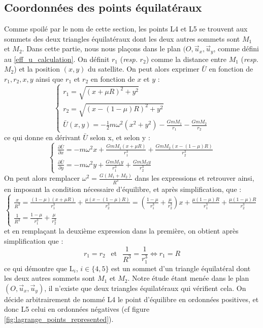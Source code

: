 \documentclass[12pt]{article}
\begin{document}
	\subsection{Coordonnées des points équilatéraux}
	Comme spoilé par le nom de cette section, les points L4 et L5 se trouvent aux sommets des deux triangles équilatéraux dont les deux autres sommets sont $M_1$ et $M_2$. Dans cette partie, nous nous plaçons dans le plan $(O,\vec{u}_x,\vec{u}_y$, comme défini au \ref{eff_u_calculation}. On définit $r_1$ (\textit{resp.} $r_2$) comme la distance entre $M_1$ (\textit{resp.} $M_2$) et la position $(x,y)$ du satellite. On peut alors exprimer $\bar{U}$ en fonction de $r_1,r_2,x,y$ ainsi que $r_1$ et $r_2$ en fonction de $x$ et $y$ :
	\begin{equation}
		\label{equi_underived_eq}
		\begin{cases}
			r_1=\sqrt{(x+\mu R)^2+y^2}
			\\ r_2 = \sqrt{(x-(1-\mu)R)^2+y^2}
			\\ \bar{U}(x,y)=-\frac{1}{2}m\omega^2(x^2+y^2)-\frac{GmM_1}{r_1}-\frac{GmM_2}{r_2}
		\end{cases}
	\end{equation}
	ce qui donne en dérivant $\bar{U}$ selon x, et selon y :
	\begin{equation}
		\label{equi_derived_eq}
		\begin{cases}
			\frac{\partial \bar{U}}{\partial x} = -m\omega^2x+\frac{GmM_1(x+\mu R)}{r_1^3}+\frac{GmM_2(x-(1-\mu)R)}{r_2^3}
			\\
			\frac{\partial \bar{U}}{\partial y} = -m\omega^2y+\frac{GmM_1y}{r_1^3}+\frac{GmM_2y}{r_2^3}
		\end{cases}
	\end{equation}
	On peut alors remplacer $\omega^2 = \frac{G(M_1+M_2)}{R^3}$ dans les expressions et retrouver ainsi, en imposant la condition nécessaire d'équilibre, et après simplification, que :
	\begin{equation}
		\begin{cases}
			\label{equilateral_CN}
			\frac{x}{R^3}=\frac{(1-\mu)(x+\mu R)}{r_1^3}+\frac{\mu(x-(1-\mu)R)}{r_2^3}=(\frac{1-\mu}{r_1^3}+\frac{\mu}{r_2^3})x+\frac{\mu(1-\mu)R}{r_1^3}+\frac{\mu(1-\mu)R}{r_2^3}
			\\
			\frac{1}{R^3}=\frac{1-\mu}{r_1^3}+\frac{\mu}{r_2^3}
		\end{cases}
	\end{equation}
	et en remplaçant la deuxième expression dans la première, on obtient après simplification que :
	\begin{equation}
		\label{equilateral_result}
		r_1=r_2 \ \ \text{ et } \ \ \frac{1}{R^3} = \frac{1}{r_1^3} \iff r_1 = R
	\end{equation}
	ce qui démontre que L$_i$, $i \in \{4,5\}$ est un sommet d'un triangle équilatéral dont les deux autres sommets sont $M_1$ et $M_2$. Notre étude étant menée dans le plan $(O,\vec{u}_x,\vec{u}_y)$, il n'existe que deux triangles équilatéraux qui vérifient cela. On décide arbitrairement de nommé L4 le point d'équilibre en ordonnées positives, et donc L5 celui en ordonnées négatives (cf figure \ref{fig:lagrange_points_represented}).
	
\end{document}
